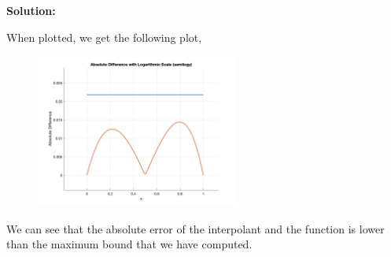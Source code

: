 \documentclass[11pt]{article}
\newenvironment{solution}
  {\par\noindent\textbf{Solution:}\par}
  {\par}
\begin{document}
\begin{enumerate}
\begin{enumerate}
\begin{solution}
  When plotted, we get the following plot,
\begin{figure}[H]
    \centering
    \includegraphics[width=0.6\textwidth]{q6d_plot.png} 
  \end{figure}
  We can see that the absolute error of the interpolant and the function is lower than the maximum bound that we have computed.

\end{solution}


\end{enumerate}

 \end{enumerate}
\end{document}
